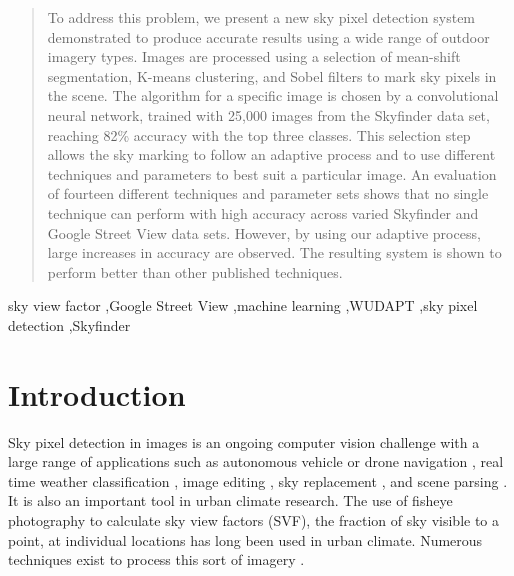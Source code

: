 \documentclass[final,3p,times,authoryear]{elsarticle}
\begin{document}
\begin{frontmatter}
\begin{abstract}
To address this problem, we present a new sky pixel detection system demonstrated to produce accurate results using a wide range of outdoor imagery types. Images are processed using a selection of mean-shift segmentation, K-means clustering, and Sobel filters to mark sky pixels in the scene. The algorithm for a specific image is chosen by a convolutional neural network, trained with 25,000 images from the Skyfinder data set, reaching 82\% accuracy with the top three classes. This selection step allows the sky marking to follow an adaptive process and to use different techniques and parameters to best suit a particular image. An evaluation of fourteen different techniques and parameter sets shows that no single technique can perform with high accuracy across varied Skyfinder and Google Street View data sets. However, by using our adaptive process, large increases in accuracy are observed. The resulting system is shown to perform better than other published techniques.



\end{abstract}

\begin{keyword}
sky view factor \sep Google Street View \sep machine learning \sep WUDAPT \sep sky pixel detection \sep Skyfinder



\end{keyword}

\end{frontmatter}

\section{Introduction}\label{sec:introduction}
Sky pixel detection in images is an ongoing computer vision challenge with a large range of applications such as autonomous vehicle or drone navigation \citep{Shen2013}, real time weather classification \citep{Roser2008}, image editing \citep{Laffont2014,Tao2009}, sky replacement \citep{Tsai2016}, and scene parsing \citep{Tighe2010,Hoiem2005}. It is also an important tool in urban climate research. The use of fisheye photography to calculate sky view factors (SVF), the fraction of sky visible to a point, at individual locations has long been used in urban climate. Numerous techniques exist to process this sort of imagery \citep{Grimmond2001,Chapman2004,Ali-Toudert2007}.
\end{document}
